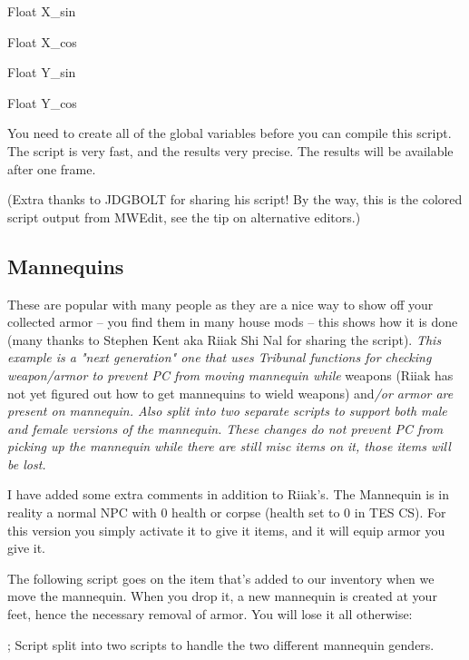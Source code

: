 Float X\_sin

Float X\_cos

Float Y\_sin

Float Y\_cos

You need to create all of the global variables before you can compile
this script. The script is very fast, and the results very precise. The
results will be available after one frame.

(Extra thanks to JDGBOLT for sharing his script! By the way, this is the
colored script output from MWEdit, see the tip on alternative editors.)



\hypertarget{mannequins}{%
\subsection{\texorpdfstring{\hfill\break
Mannequins}{ Mannequins}}\label{mannequins}}

These are popular with many people as they are a nice way to show off
your collected armor -- you find them in many house mods -- this shows
how it is done (many thanks to Stephen Kent aka Riiak Shi Nal for
sharing the script). \emph{This example is a "next generation" one that
uses Tribunal functions for checking weapon/armor to prevent PC from
moving mannequin while} weapons (Riiak has not yet figured out how to
get mannequins to wield weapons) and\emph{/or armor are present on
mannequin. Also split into two separate scripts to support both male and
female versions of the mannequin. These changes do not prevent PC from
picking up the mannequin while there are still misc items on it, those
items will be lost.}

I have added some extra comments in addition to Riiak's. The Mannequin
is in reality a normal NPC with 0 health or corpse (health set to 0 in
TES CS). For this version you simply activate it to give it items, and
it will equip armor you give it.



The following script goes on the item that's added to our inventory when
we move the mannequin. When you drop it, a new mannequin is created at
your feet, hence the necessary removal of armor. You will lose it all
otherwise:

; Script split into two scripts to handle the two different mannequin
genders.


